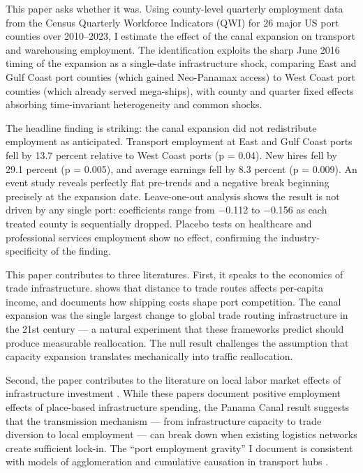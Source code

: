 \documentclass[12pt]{article}
\begin{document}
This paper asks whether it was. Using county-level quarterly employment data from the Census Quarterly Workforce Indicators (QWI) for 26 major US port counties over 2010--2023, I estimate the effect of the canal expansion on transport and warehousing employment. The identification exploits the sharp June 2016 timing of the expansion as a single-date infrastructure shock, comparing East and Gulf Coast port counties (which gained Neo-Panamax access) to West Coast port counties (which already served mega-ships), with county and quarter fixed effects absorbing time-invariant heterogeneity and common shocks.

The headline finding is striking: the canal expansion did not redistribute employment as anticipated. Transport employment at East and Gulf Coast ports fell by 13.7 percent relative to West Coast ports (p = 0.04). New hires fell by 29.1 percent (p = 0.005), and average earnings fell by 8.3 percent (p = 0.009). An event study reveals perfectly flat pre-trends and a negative break beginning precisely at the expansion date. Leave-one-out analysis shows the result is not driven by any single port: coefficients range from $-$0.112 to $-$0.156 as each treated county is sequentially dropped. Placebo tests on healthcare and professional services employment show no effect, confirming the industry-specificity of the finding.

This paper contributes to three literatures. First, it speaks to the economics of trade infrastructure. \citet{feyrer2019} shows that distance to trade routes affects per-capita income, and \citet{brancaccio2020} documents how shipping costs shape port competition. The canal expansion was the single largest change to global trade routing infrastructure in the 21st century --- a natural experiment that these frameworks predict should produce measurable reallocation. The null result challenges the assumption that capacity expansion translates mechanically into traffic reallocation.

Second, the paper contributes to the literature on local labor market effects of infrastructure investment \citep{moretti2010, kline2014}. While these papers document positive employment effects of place-based infrastructure spending, the Panama Canal result suggests that the transmission mechanism --- from infrastructure capacity to trade diversion to local employment --- can break down when existing logistics networks create sufficient lock-in. The ``port employment gravity'' I document is consistent with models of agglomeration and cumulative causation in transport hubs \citep{fujita1999}.
\end{document}
